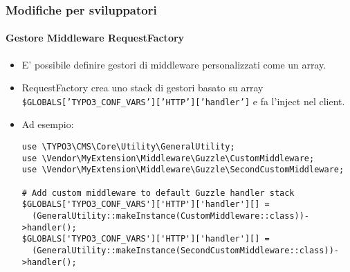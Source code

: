 \begin{frame}[fragile]
	\frametitle{Modifiche per sviluppatori}
	\framesubtitle{Gestore Middleware RequestFactory}

	\lstset{basicstyle=\tiny\ttfamily}

	\begin{itemize}
		\item E' possibile definire gestori di middleware personalizzati come un array.
		\item RequestFactory crea uno stack di gestori basato su array\newline
			\small
				\texttt{\$GLOBALS['TYPO3\_CONF\_VARS']['HTTP']['handler']}
			\normalsize
			e fa l'inject nel client.
		\item Ad esempio:

\begin{lstlisting}
use \TYPO3\CMS\Core\Utility\GeneralUtility;
use \Vendor\MyExtension\Middleware\Guzzle\CustomMiddleware;
use \Vendor\MyExtension\Middleware\Guzzle\SecondCustomMiddleware;

# Add custom middleware to default Guzzle handler stack
$GLOBALS['TYPO3_CONF_VARS']['HTTP']['handler'][] =
  (GeneralUtility::makeInstance(CustomMiddleware::class))->handler();
$GLOBALS['TYPO3_CONF_VARS']['HTTP']['handler'][] =
  (GeneralUtility::makeInstance(SecondCustomMiddleware::class))->handler();
\end{lstlisting}

	\end{itemize}

\end{frame}


